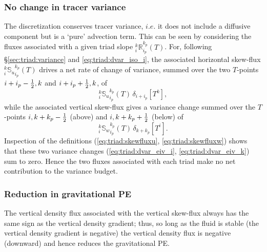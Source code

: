 \subsubsection{No change in tracer variance}
The discretization conserves tracer variance, $i.e.$ it does not
include a diffusive component but is a `pure' advection term. This can
be seen
by considering the
fluxes associated with a given triad slope
$_i^k{\mathbb{R}}_{i_p}^{k_p} (T)$. For, following
\S\ref{sec:triad:variance} and \eqref{eq:triad:dvar_iso_i}, the
associated horizontal skew-flux $_i^k{\mathbb{S}_u}_{i_p}^{k_p} (T)$
drives a net rate of change of variance, summed over the two
$T$-points $i+i_p-\textstyle\frac{1}{2},k$ and $i+i_p+\textstyle\frac{1}{2},k$, of
\begin{equation}
\label{eq:triad:dvar_eiv_i}
  _i^k{\mathbb{S}_u}_{i_p}^{k_p} (T)\,\delta_{i+ i_p}[T^k],
\end{equation}
while the associated vertical skew-flux gives a variance change summed over the
$T$-points $i,k+k_p-\textstyle\frac{1}{2}$ (above) and $i,k+k_p+\textstyle\frac{1}{2}$ (below) of
\begin{equation}
\label{eq:triad:dvar_eiv_k}
  _i^k{\mathbb{S}_w}_{i_p}^{k_p} (T) \,\delta_{k+ k_p}[T^i].
\end{equation}
Inspection of the definitions (\ref{eq:triad:skewfluxu}, \ref{eq:triad:skewfluxw})
shows that these two variance changes (\ref{eq:triad:dvar_eiv_i}, \ref{eq:triad:dvar_eiv_k})
sum to zero. Hence the two fluxes associated with each triad make no
net contribution to the variance budget.

\subsubsection{Reduction in gravitational PE}
The vertical density flux associated with the vertical skew-flux
always has the same sign as the vertical density gradient; thus, so
long as the fluid is stable (the vertical density gradient is
negative) the vertical density flux is negative (downward) and hence
reduces the gravitational PE.

